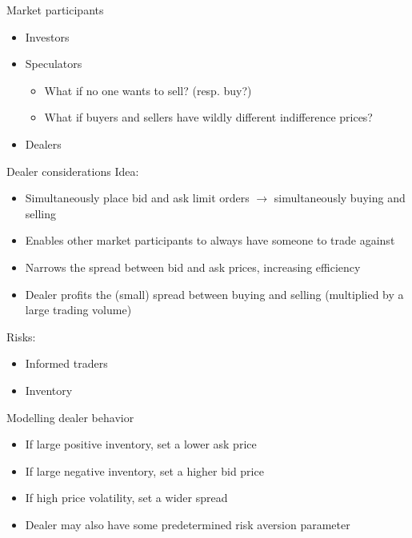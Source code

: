 \documentclass{beamer} %
\begin{document}
\begin{frame}{Market participants}
    \begin{itemize}
        \item Investors
        \item Speculators
        \begin{itemize}
            \item What if no one wants to sell? (resp. buy?)
            \item What if buyers and sellers have wildly different indifference prices?
        \end{itemize}
        \item Dealers
    \end{itemize}
\end{frame}

\begin{frame}{Dealer considerations}
    Idea:
    \begin{itemize}
        \item Simultaneously place bid and ask limit orders $\rightarrow$ simultaneously buying and selling
        \item Enables other market participants to always have someone to trade against
        \item Narrows the spread between bid and ask prices, increasing efficiency
        \item Dealer profits the (small) spread between buying and selling (multiplied by a large trading volume)
    \end{itemize}
    Risks:
    \begin{itemize}
        \item Informed traders
        \item Inventory
    \end{itemize}
\end{frame}

\begin{frame}{Modelling dealer behavior}
    \begin{itemize}
        \item If large positive inventory, set a lower ask price
        \item If large negative inventory, set a higher bid price
        \item If high price volatility, set a wider spread 
        \item Dealer may also have some predetermined risk aversion parameter
    \end{itemize}
\end{frame}
\end{document}
